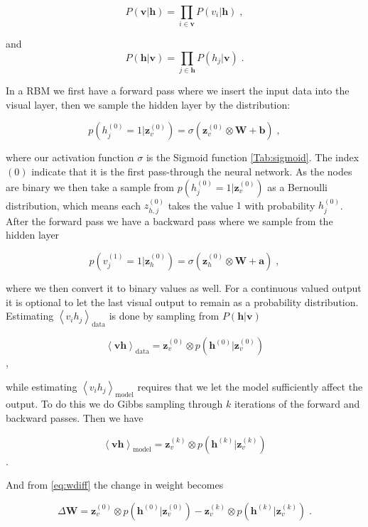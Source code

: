 \begin{equation}
    P(\boldsymbol{v} | \boldsymbol{h} ) = \prod_{i \in \boldsymbol{v}} P(v_i | \boldsymbol{h} ) \; , 
\end{equation}

and
\begin{equation}
    P(\boldsymbol{h} | \boldsymbol{v} ) = \prod_{j \in \boldsymbol{h}} P(h_j | \boldsymbol{v} ) \; .
\end{equation}

In a RBM we first have a forward pass where we insert the input data into the visual layer, then we sample the hidden layer by the distribution:

\begin{equation}
    p(h_j^{(0)} = 1 | \boldsymbol{z}_{v}^{(0)}) = \sigma\left (\boldsymbol{z}_{v}^{(0)} \otimes \boldsymbol{W} + \boldsymbol{b} \right ) \; , 
\end{equation}

where our activation function $\sigma$ is the Sigmoid function \ref{Tab:sigmoid}. The index $(0)$ indicate that it is the first pass-through the neural network. As the nodes are binary we then take a sample from $p(h_j^{(0)}=1 | \boldsymbol{z}_v^{(0)} )$ as a Bernoulli distribution, which means each $z_{h, j}^{(0)}$ takes the value $1$ with probability $h_j^{(0)}$. After the forward pass we have a backward pass where we sample from the hidden layer

\begin{equation}
    p(v_j^{(1)} = 1 | \boldsymbol{z}_{h}^{(0)}) = \sigma\left (\boldsymbol{z}_{h}^{(0)} \otimes \boldsymbol{W} + \boldsymbol{a} \right ) \; , 
\end{equation}

where we then convert it to binary values as well. For a continuous valued output it is optional to let the last visual output to remain as a probability distribution. Estimating $\left < v_i h_j \right >_{\text{data}}$ is done by sampling from $P(\boldsymbol{h} | \boldsymbol{v} )$

\begin{equation}
    \left < \boldsymbol{v} \boldsymbol{h} \right >_{\text{data}} = \boldsymbol{z}_v^{(0)} \otimes p(\boldsymbol{h}^{(0)} | \boldsymbol{z}_{v}^{(0)})
\end{equation} \; ,

while estimating $ \left < v_i h_j \right >_{\text{model}}$ requires that we let the model sufficiently affect the output. To do this we do Gibbs sampling through $k$ iterations of the forward and backward passes. Then we have

\begin{equation}
    \left < \boldsymbol{v} \boldsymbol{h} \right >_{\text{model}} = \boldsymbol{z}_v^{(k)} \otimes p(\boldsymbol{h}^{(k)} | \boldsymbol{z}_{v}^{(k)})
\end{equation} \; .

And from \ref{eq:wdiff} the change in weight becomes

\begin{equation}
    \Delta \boldsymbol{W} = \boldsymbol{z}_v^{(0)} \otimes p(\boldsymbol{h}^{(0)} | \boldsymbol{z}_{v}^{(0)}) - \boldsymbol{z}_v^{(k)} \otimes p(\boldsymbol{h}^{(k)} | \boldsymbol{z}_{v}^{(k)}) \; .
\end{equation}
